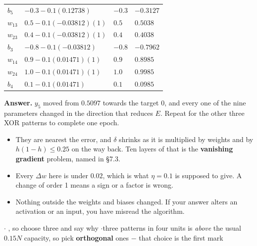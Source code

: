 {\begin{tabularx}{\linewidth}{@{}L{1.2cm}L{3.8cm}XX@{}}
$b_5$    & $-0.3 - 0.1(0.12738)$ & $-0.3$ & $\mathbf{-0.3127}$ \\
$w_{13}$ & $0.5 - 0.1(-0.03812)(1)$ & $0.5$ & $\mathbf{0.5038}$ \\
$w_{23}$ & $0.4 - 0.1(-0.03812)(1)$ & $0.4$ & $\mathbf{0.4038}$ \\
$b_3$    & $-0.8 - 0.1(-0.03812)$ & $-0.8$ & $\mathbf{-0.7962}$ \\
$w_{14}$ & $0.9 - 0.1(0.01471)(1)$ & $0.9$ & $\mathbf{0.8985}$ \\
$w_{24}$ & $1.0 - 0.1(0.01471)(1)$ & $1.0$ & $\mathbf{0.9985}$ \\
$b_4$    & $0.1 - 0.1(0.01471)$ & $0.1$ & $\mathbf{0.0985}$ \\
\end{tabularx}
\par{}\vspace{2pt}
\noindent\colorbox{gdL}{\parbox{\dimexpr\linewidth-2\fboxsep}{\textbf{Answer.}
$y_5$ moved from $0.5097$ towards the target 0, and every one of the nine parameters
changed in the direction that reduces $E$. Repeat for the other three XOR patterns to
complete one epoch.}}
\begin{itemize}
  \item {} They are nearest the
        error, and $\delta$ shrinks as it is multiplied by weights and by
        $h(1-h) \le 0.25$ on the way back. Ten layers of that is the
        \textbf{vanishing gradient} problem, named in \S7.3.
  \item Every $\Delta w$ here is under $0.02$, which is what
        $\eta = 0.1$ is supposed to give. A change of order 1 means a sign or a factor
        is wrong.
  \item Nothing outside the weights and biases changed. If your answer alters an
        activation or an input, you have misread the algorithm.
\end{itemize}}


{\color{sub}\footnotesize {}  \gap$\cdot$\gap
{}, so choose three and say why
\gap$\cdot$\gap three patterns in four units is \emph{above} the usual $0.15N$ capacity,
so pick \textbf{orthogonal} ones $-$ that choice is the first mark}

